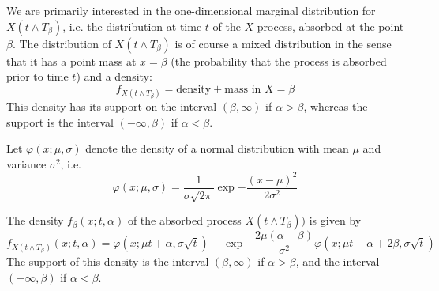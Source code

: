 We are primarily interested in the one-dimensional marginal distribution for $X(t\wedge T_{\beta})$, i.e. the distribution at time $t$ of the $X$-process, absorbed at the point $\beta$. The distribution of $X(t\wedge T_{\beta})$ is of course a mixed distribution in the sense that it has a point mass at $x = \beta$ (the probability that the process is absorbed prior to time $t$) and a density:
\begin{equation}
    f_{X(t\wedge T_{\beta})} = \text{density} + \text{mass in }X= \beta
\end{equation}
This density has its support on the interval $(\beta,\infty)$ if $\alpha > \beta$, whereas the support is the interval $(-\infty,\beta)$ if $\alpha < \beta$.
\begin{definition}
    Let $\varphi(x;\mu, \sigma)$ denote the density of a normal distribution with mean $\mu$ and variance $\sigma^2$, i.e.
    \begin{equation}
        \varphi(x;\mu, \sigma) = \frac{1}{\sigma\sqrt{2\pi}}\exp{-\frac{(x-\mu)^2}{2\sigma^2}}
    \end{equation}
\end{definition}
\begin{proposition}\label{f}
    The density $f_{\beta}(x;t,\alpha)$ of the absorbed process $X(t\wedge T_{\beta}))$ is given by
    \begin{equation}
        f_{X(t\wedge T_{\beta})}(x;t,\alpha) = \varphi(x;\mu t+ \alpha, \sigma\sqrt{t})-\exp{-\frac{2\mu(\alpha-\beta)}{\sigma^2}}\varphi(x;\mu t - \alpha + 2\beta, \sigma\sqrt{t})
    \end{equation}
    The support of this density is the interval $(\beta,\infty)$ if $\alpha > \beta$, and the interval $(-\infty,\beta)$ if $\alpha < \beta$.
\end{proposition}

